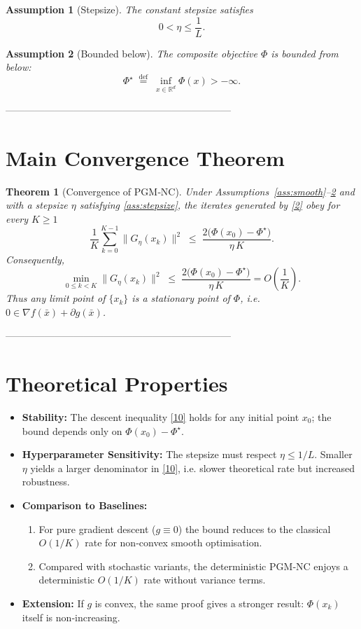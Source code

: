 \documentclass{article}
\newtheorem{theorem}{Theorem}
\newtheorem{assumption}{Assumption}
\begin{document}
\begin{assumption}[Stepsize]\label{ass:stepsize}
The constant stepsize satisfies
\[
0<\eta\le\frac{1}{L}.
\tag{8}
\]
\end{assumption}

\begin{assumption}[Bounded below]\label{ass:bound}
The composite objective $\Phi$ is bounded from below:
\[
\Phi^\star\;\stackrel{\text{def}}{=}\;\inf_{x\in\mathbb{R}^d}\Phi(x)>-\infty .
\tag{9}
\]
\end{assumption}

---------------------------------------------------------------------

\section*{Main Convergence Theorem}
\begin{theorem}[Convergence of PGM‑NC]\label{thm:main}
Under Assumptions~\ref{ass:smooth}–\ref{ass:bound} and with a stepsize $\eta$ satisfying \eqref{ass:stepsize}, the iterates generated by \eqref{2} obey for every $K\ge1$
\[
\frac{1}{K}\sum_{k=0}^{K-1}\|G_{\eta}(x_k)\|^{2}
\;\le\;
\frac{2\bigl(\Phi(x_0)-\Phi^\star\bigr)}{\eta\,K}.
\tag{10}
\]
Consequently,
\[
\min_{0\le k<K}\|G_{\eta}(x_k)\|^{2}
\;\le\;
\frac{2\bigl(\Phi(x_0)-\Phi^\star\bigr)}{\eta\,K}
=O\!\left(\frac{1}{K}\right).
\tag{11}
\]
Thus any limit point of $\{x_k\}$ is a \emph{stationary point} of $\Phi$, i.e. $0\in\nabla f(\bar x)+\partial g(\bar x)$.
\end{theorem}

---------------------------------------------------------------------

\section*{Theoretical Properties}
\begin{itemize}
    \item \textbf{Stability:} The descent inequality \eqref{10} holds for any initial point $x_0$; the bound depends only on $\Phi(x_0)-\Phi^\star$.
    \item \textbf{Hyperparameter Sensitivity:} The stepsize must respect $\eta\le1/L$. Smaller $\eta$ yields a larger denominator in \eqref{10}, i.e. slower theoretical rate but increased robustness.
    \item \textbf{Comparison to Baselines:}
    \begin{enumerate}[label=(\alph*)]
        \item For pure gradient descent ($g\equiv0$) the bound reduces to the classical $O(1/K)$ rate for non‑convex smooth optimisation.
        \item Compared with stochastic variants, the deterministic PGM‑NC enjoys a deterministic $O(1/K)$ rate without variance terms.
    \end{enumerate}
    \item \textbf{Extension:} If $g$ is convex, the same proof gives a stronger result: $\Phi(x_{k})$ itself is non‑increasing.
\end{itemize}
\end{document}
